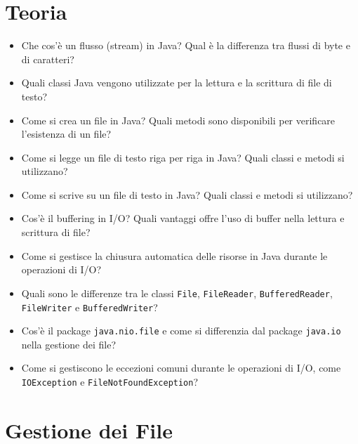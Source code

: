 \documentclass{article}
\begin{document}
\section{Teoria}

\begin{itemize}
    \item Che cos'è un flusso (stream) in Java? Qual è la differenza tra flussi di byte e di caratteri?
    \item Quali classi Java vengono utilizzate per la lettura e la scrittura di file di testo?
    \item Come si crea un file in Java? Quali metodi sono disponibili per verificare l'esistenza di un file?
    \item Come si legge un file di testo riga per riga in Java? Quali classi e metodi si utilizzano?
    \item Come si scrive su un file di testo in Java? Quali classi e metodi si utilizzano?
    \item Cos'è il buffering in I/O? Quali vantaggi offre l'uso di buffer nella lettura e scrittura di file?
    \item Come si gestisce la chiusura automatica delle risorse in Java durante le operazioni di I/O?
    \item Quali sono le differenze tra le classi \texttt{File}, \texttt{FileReader}, \texttt{BufferedReader}, \texttt{FileWriter} e \texttt{BufferedWriter}?
    \item Cos'è il package \texttt{java.nio.file} e come si differenzia dal package \texttt{java.io} nella gestione dei file?
    \item Come si gestiscono le eccezioni comuni durante le operazioni di I/O, come \texttt{IOException} e \texttt{FileNotFoundException}?
\end{itemize}

\section{Gestione dei File}
\end{document}
